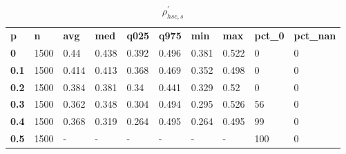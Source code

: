\begin{table}[h]
 \centering 
\footnotesize
\caption{$\rho_{hsc,s}^\prime $}
\label{tab:alphahscs}
\begin{tabular}[h]{| l l l l l l l l l l|
    } \hline
\textbf{ p} & \textbf{ n} & \textbf{ avg} & \textbf{ med} & \textbf{ q025} & \textbf{ q975} & \textbf{ min} & \textbf{ max} & \textbf{ pct\_0} & \textbf{ pct\_nan}
           \\
  \textbf{  0} & 1500 &  0.44 & 0.438 & 0.392 & 0.496 & 0.381 & 0.522 &   0 & 0
           \\
  \textbf{0.1} & 1500 & 0.414 & 0.413 & 0.368 & 0.469 & 0.352 & 0.498 &   0 & 0
           \\
  \textbf{0.2} & 1500 & 0.384 & 0.381 &  0.34 & 0.441 & 0.329 &  0.52 &   0 & 0
           \\
  \textbf{0.3} & 1500 & 0.362 & 0.348 & 0.304 & 0.494 & 0.295 & 0.526 &  56 & 0
           \\
  \textbf{0.4} & 1500 & 0.368 & 0.319 & 0.264 & 0.495 & 0.264 & 0.495 &  99 & 0
           \\
  \textbf{0.5} & 1500 & - & - & - & - & - & - & 100 & 0
           \\
 \hline \end{tabular}
 \end{table}
